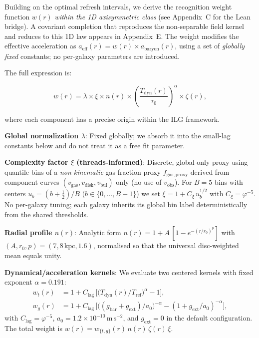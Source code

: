 \documentclass[12pt,a4paper]{article}
\begin{document}
Building on the optimal refresh intervals, we derive the recognition weight function $w(r)$ \emph{within the 1D axisymmetric class} (see Appendix~C for the Lean bridge). A covariant completion that reproduces the non-separable field kernel and reduces to this 1D law appears in Appendix~E. The weight modifies the effective acceleration as $a_\mathrm{eff}(r) = w(r) \times a_\mathrm{baryon}(r)$, using a set of \emph{globally fixed} constants; no per-galaxy parameters are introduced.

The full expression is:

\begin{equation}
w(r) = \lambda \times \xi \times n(r) \times \left(\frac{T_\mathrm{dyn}(r)}{\tau_0}\right)^\alpha \times \zeta(r),
\end{equation}

where each component has a precise origin within the ILG framework.

\textbf{Global normalization $\lambda$}: Fixed globally; we absorb it into the small-lag constants below and do not treat it as a free fit parameter.

\textbf{Complexity factor $\xi$ (threads-informed)}: Discrete, global-only proxy using quantile bins of a \emph{non-kinematic} gas-fraction proxy $f_\mathrm{gas,proxy}$ derived from component curves $(v_\mathrm{gas},v_\mathrm{disk},v_\mathrm{bul})$ only (no use of $v_\mathrm{obs}$). For $B=5$ bins with centers $u_b=(b+\tfrac{1}{2})/B$ ($b\in\{0,\dots,B{-}1\}$) we set $\xi = 1 + C_\xi\,u_b^{1/2}$ with $C_\xi = \varphi^{-5}$. No per-galaxy tuning; each galaxy inherits its global bin label deterministically from the shared thresholds.

\textbf{Radial profile $n(r)$}: Analytic form $n(r) = 1 + A\,[1 - e^{-(r/r_0)^p}]$ with $(A, r_0, p) = (7, 8\,\mathrm{kpc}, 1.6)$, normalised so that the universal disc-weighted mean equals unity.

\textbf{Dynamical/acceleration kernels}: We evaluate two centered kernels with fixed exponent $\alpha = 0.191$:
\begin{align}
w_t(r) &= 1 + C_\mathrm{lag}\,\Big[\big(T_\mathrm{dyn}(r)/T_\mathrm{ref}\big)^{\alpha} - 1\Big],\\
w_g(r) &= 1 + C_\mathrm{lag}\,\Big[\big((g_\mathrm{bar}+g_\mathrm{ext})/a_0\big)^{-\alpha} - (1+g_\mathrm{ext}/a_0)^{-\alpha}\Big],
\end{align}
with $C_\mathrm{lag} = \varphi^{-5}$, $a_0 = 1.2\times10^{-10}\,\mathrm{m\,s^{-2}}$, and $g_\mathrm{ext}=0$ in the default configuration. The total weight is $w(r) = w_{\{t,g\}}(r)\, n(r)\,\zeta(r)\,\xi$.
\end{document}
